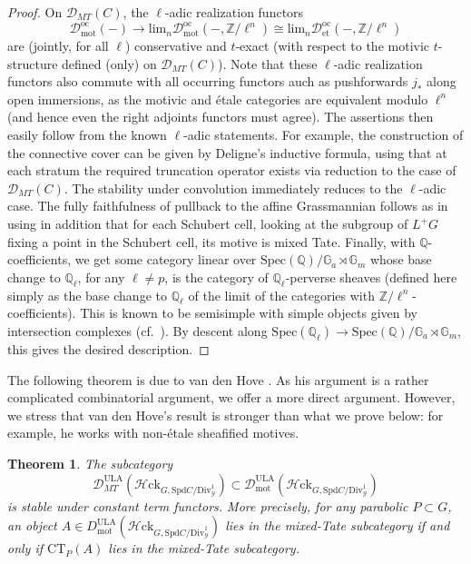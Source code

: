 \documentclass[11pt]{amsart}
\numberwithin{equation}{section}
\newtheorem{theorem}{Theorem}
\numberwithin{theorem}{section}
\theoremstyle{definition}
\newcommand{\Hloc}{{\mathcal H}{\mathrm{ck}}}
\begin{document}
\begin{proof} On $\mathcal D_{MT}(C)$, the $\ell$-adic realization functors
\[
\mathcal D_{\mathrm{mot}}^{\mathrm{oc}}(-)\to \mathrm{lim}_n \mathcal D_{\mathrm{mot}}^{\mathrm{oc}}(-,\mathbb Z/\ell^n)\cong  \mathrm{lim}_n \mathcal D_{\mathrm{et}}^{\mathrm{oc}}(-,\mathbb Z/\ell^n)
\]
are (jointly, for all $\ell$) conservative and $t$-exact (with respect to the motivic $t$-structure defined (only) on $\mathcal D_{MT}(C)$). Note that these $\ell$-adic realization functors also commute with all occurring functors auch as pushforwards $j_\ast$ along open immersions, as the motivic and \'etale categories are equivalent modulo $\ell^n$ (and hence even the right adjoints functors must agree). The assertions then easily follow from the known $\ell$-adic statements. For example, the construction of the connective cover can be given by Deligne's inductive formula, using that at each stratum the required truncation operator exists via reduction to the case of $\mathcal D_{MT}(C)$. The stability under convolution immediately reduces to the $\ell$-adic case. The fully faithfulness of pullback to the affine Grassmannian follows as in \cite[Lemma VI.7.3]{FarguesScholze} using in addition that for each Schubert cell, looking at the subgroup of $L^+ G$ fixing a point in the Schubert cell, its motive is mixed Tate. Finally, with $\mathbb Q$-coefficients, we get some category linear over $\mathrm{Spec}(\mathbb Q)/\mathbb G_a\rtimes \mathbb G_m$ whose base change to $\mathbb Q_\ell$, for any $\ell\neq p$, is the category of $\mathbb Q_\ell$-perverse sheaves (defined here simply as the base change to $\mathbb Q_\ell$ of the limit of the categories with $\mathbb Z/\ell^n$-coefficients). This is known to be semisimple with simple objects given by intersection complexes (cf.~\cite[Proposition VI.7.5]{FarguesScholze}). By descent along $\mathrm{Spec}(\mathbb Q_\ell)\to \mathrm{Spec}(\mathbb Q)/\mathbb G_a\rtimes \mathbb G_m$, this gives the desired description.
\end{proof}

The following theorem is due to van den Hove \cite{vandenHoveWitt}. As his argument is a rather complicated combinatorial argument, we offer a more direct argument. However, we stress that van den Hove's result is stronger than what we prove below: for example, he works with non-\'etale sheafified motives.

\begin{theorem} The subcategory
\[
\mathcal D_{MT}^{\mathrm{ULA}}(\Hloc_{G,\mathrm{Spd} C/\mathrm{Div}^1_{\mathcal Y}})\subset \mathcal D_{\mathrm{mot}}^{\mathrm{ULA}}(\Hloc_{G,\mathrm{Spd} C/\mathrm{Div}^1_{\mathcal Y}})
\]
is stable under constant term functors. More precisely, for any parabolic $P\subset G$, an object $A\in D_{\mathrm{mot}}^{\mathrm{ULA}}(\Hloc_{G,\mathrm{Spd} C/\mathrm{Div}^1_{\mathcal Y}})$ lies in the mixed-Tate subcategory if and only if $\mathrm{CT}_P(A)$ lies in the mixed-Tate subcategory.
\end{theorem}
\end{document}
